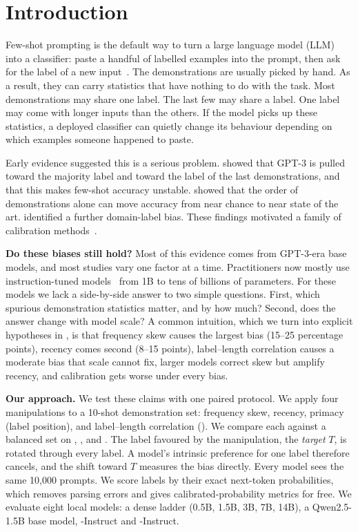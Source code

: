 \section{Introduction}
\label{sec:intro}

Few-shot prompting is the default way to turn a large language model (LLM) into a classifier: paste a handful of labelled examples into the prompt, then ask for the label of a new input~\citep{brown2020language}. The demonstrations are usually picked by hand. As a result, they can carry statistics that have nothing to do with the task. Most demonstrations may share one label. The last few may share a label. One label may come with longer inputs than the others. If the model picks up these statistics, a deployed classifier can quietly change its behaviour depending on which examples someone happened to paste.

Early evidence suggested this is a serious problem. \citet{zhao2021calibrate} showed that GPT-3 is pulled toward the majority label and toward the label of the last demonstrations, and that this makes few-shot accuracy unstable. \citet{lu2022fantastically} showed that the order of demonstrations alone can move accuracy from near chance to near state of the art. \citet{fei2023mitigating} identified a further domain-label bias. These findings motivated a family of calibration methods~\citep{zhao2021calibrate,fei2023mitigating,zhou2024batch}.

{\bf Do these biases still hold?} Most of this evidence comes from GPT-3-era base models, and most studies vary one factor at a time. Practitioners now mostly use instruction-tuned models~\citep{ouyang2022training} from 1B to tens of billions of parameters. For these models we lack a side-by-side answer to two simple questions. First, which spurious demonstration statistics matter, and by how much? Second, does the answer change with model scale? A common intuition, which we turn into explicit hypotheses in , is that frequency skew causes the largest bias (15--25 percentage points), recency comes second (8--15 points), label--length correlation causes a moderate bias that scale cannot fix, larger models correct skew but amplify recency, and calibration gets worse under every bias.

{\bf Our approach.} We test these claims with one paired protocol. We apply four manipulations to a 10-shot demonstration set: frequency skew, recency, primacy (label position), and label--length correlation (). We compare each against a balanced \clean set on \sst, \rte, \agnews and \mrpc. The label favoured by the manipulation, the \emph{target} $T$, is rotated through every label. A model's intrinsic preference for one label therefore cancels, and the shift toward $T$ measures the bias directly. Every model sees the same 10,000 prompts. We score labels by their exact next-token probabilities, which removes parsing errors and gives calibrated-probability metrics for free. We evaluate eight local models: a dense \qwen ladder (0.5B, 1.5B, 3B, 7B, 14B), a Qwen2.5-1.5B base model, \llamaone-Instruct and \llamaeight-Instruct.

